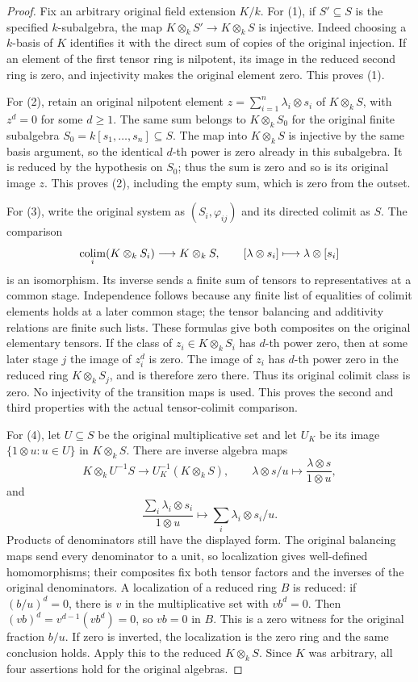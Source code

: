 \begin{proof}
Fix an arbitrary original field extension $K/k$.
For (1), if $S'\subseteq S$ is the specified
$k$-subalgebra, the map
$K\otimes_kS'\to K\otimes_kS$ is injective.
Indeed choosing a $k$-basis of $K$ identifies it
with the direct sum of copies of the original
injection. If an element of the first tensor
ring is nilpotent, its image in the reduced
second ring is zero, and injectivity makes the
original element zero. This proves (1).

For (2), retain an original nilpotent element
$z=\sum_{i=1}^n\lambda_i\otimes s_i$ of
$K\otimes_kS$, with $z^d=0$ for some $d\geq1$.
The same sum belongs to $K\otimes_kS_0$ for
the original finite subalgebra
$S_0=k[s_1,\ldots,s_n]\subseteq S$.
The map into $K\otimes_kS$ is injective by
the same basis argument, so the identical
$d$-th power is zero already in this subalgebra.
It is reduced by the hypothesis on $S_0$;
thus the sum is zero and so is its original
image $z$. This proves (2), including the
empty sum, which is zero from the outset.

For (3), write the original system as
$(S_i,\varphi_{ij})$ and its directed colimit
as $S$. The comparison
$$
\mathop{\rm colim}_i(K\otimes_kS_i)
\longrightarrow K\otimes_kS,
\qquad [\lambda\otimes s_i]\longmapsto
\lambda\otimes[s_i]
$$
is an isomorphism. Its inverse sends a finite
sum of tensors to representatives at a common
stage. Independence follows because any finite
list of equalities of colimit elements holds
at a later common stage; the tensor balancing
and additivity relations are finite such lists.
These formulas give both composites on the
original elementary tensors. If the class of
$z_i\in K\otimes_kS_i$ has $d$-th power zero,
then at some later stage $j$ the image of
$z_i^d$ is zero. The image of $z_i$ has
$d$-th power zero in the reduced ring
$K\otimes_kS_j$, and is therefore zero there.
Thus its original colimit class is zero.
No injectivity of the transition maps is used.
This proves the second and third properties
with the actual tensor-colimit comparison.

For (4), let $U\subseteq S$ be the original
multiplicative set and let $U_K$ be its image
$\{1\otimes u:u\in U\}$ in $K\otimes_kS$.
There are inverse algebra maps
$$
K\otimes_kU^{-1}S\longrightarrow
U_K^{-1}(K\otimes_kS),\qquad
\lambda\otimes s/u\longmapsto
\frac{\lambda\otimes s}{1\otimes u},
$$
and
$$
\frac{\sum_i\lambda_i\otimes s_i}{1\otimes u}
\longmapsto\sum_i\lambda_i\otimes s_i/u.
$$
Products of denominators still have the displayed
form. The original balancing maps send every
denominator to a unit, so localization gives
well-defined homomorphisms; their composites
fix both tensor factors and the inverses of
the original denominators. A localization of
a reduced ring $B$ is reduced: if
$(b/u)^d=0$, there is $v$ in the multiplicative
set with $vb^d=0$. Then
$(vb)^d=v^{d-1}(vb^d)=0$, so $vb=0$ in $B$.
This is a zero witness for the original fraction
$b/u$. If zero is inverted, the localization
is the zero ring and the same conclusion holds.
Apply this to the reduced $K\otimes_kS$.
Since $K$ was arbitrary, all four assertions
hold for the original algebras.
\end{proof}

